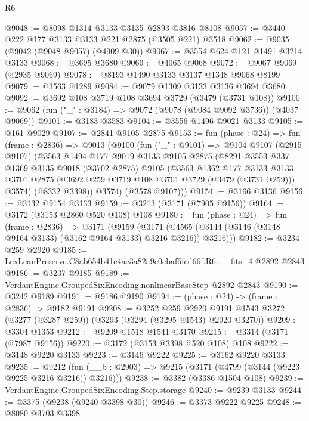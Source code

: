 \begin{lexlean}{R6}
\begin{coremodule}
@9048 := @8098 @1314 @3133 @3135 @2893 @3816 @8108
@9057 := @3440 @222 @177 @3133 @3133 @221 @2875 (@3505 @221) @3518
@9062 := @9035 (@9042 (@9048 @9057) (@4909 @30))
@9067 := @3554 @624 @121 @1491 @3214 @3133
@9068 := @3695 @3680
@9069 := @4065 @9068
@9072 := @9067 @9069 (@2935 @9069)
@9078 := @8193 @1490 @3133 @3137 @1348 @9068 @8199
@9079 := @3563 @1289
@9084 := @9079 @1309 @3133 @3136 @3694 @3680
@9092 := @3692 @108 @3719 @108 @3694 @3729 (@3479 (@3731 @108))
@9100 := @9062 (fun ("_" : @3184) => @9072 (@9078 (@9084 @9092 @3736)) (@4037 @9069))
@9101 := @3183 @3583
@9104 := @3556 @1496 @9021 @3133
@9105 := @161 @9029
@9107 := @2841 @9105 @2875
@9153 := fun (phase : @24) =>
  fun (frame : @2836) =>
  @9013
    (@9100
      (fun ("_" : @9101) =>
      @9104
        @9107
        (@2915 @9107)
        (@3563
          @1494
          @177
          @9019
          @3133
          @9105
          @2875
          (@8291
            @3553
            @337
            @1369
            @3135
            @9018
            (@3702 @2875)
            @9105
            (@3563
              @1362
              @177
              @3133
              @3133
              @3701
              @2875
              (@3692 @259 @3719 @108 @3701 @3729 (@3479 (@3731 @259)))
              @3574)
            (@8332 @3398))
          @3574)
        (@3578 @9107)))
@9154 := @3166 @3136
@9156 := @3132 @9154 @3133
@9159 := @3213 (@3171 (@7905 @9156))
@9164 := @3172 (@3153 @2860 @520 @108) @108
@9180 := fun (phase : @24) =>
  fun (frame : @2836) =>
  @3171
    (@9159
      (@3171 (@4565 (@3144 (@3146 (@3148 @9164 @3133) (@3162 @9164 @3133) @3216 @3216)) @3216)))
@9182 := @3234 @259 @2920
@9185 := LexLeanPreserve.C8ab654b41c4ae3a82a9c0ebaf6fcd66f.R6.__fits_4 @2892 @2843
@9186 := @3237 @9185
@9189 := VerdantEngine.GroupedSixEncoding.nonlinearBaseStep @2892 @2843
@9190 := @3242 @9189
@9191 := @9186 @9190
@9194 := (phase : @24) -> (frame : @2836) -> @9182 @9191
@9208 := @3252
    @259
    @2920
    @9191
    @1543
    @3272
    (@3277 (@3287 @259))
    (@3293 (@3294 (@3295 @1543) @2920 @3270))
@9209 := @3304 @1353
@9212 := @9209 @1518 @1541 @3170
@9215 := @3314 (@3171 (@7987 @9156))
@9220 := @3172 (@3153 @3398 @520 @108) @108
@9222 := @3148 @9220 @3133
@9223 := @3146 @9222
@9225 := @3162 @9220 @3133
@9235 := @9212 (fun (__b : @2903) => @9215 (@3171 (@4799 (@3144 (@9223 @9225 @3216 @3216)) @3216)))
@9238 := @3382 (@3386 @1504 @108)
@9239 := VerdantEngine.GroupedSixEncoding.Step.storage
@9240 := @9239 @3133
@9244 := @3375 (@9238 (@9240 @3398 @30))
@9246 := @3373 @9222 @9225
@9248 := @8080 @3703 @3398

\end{coremodule}
\end{lexlean}
